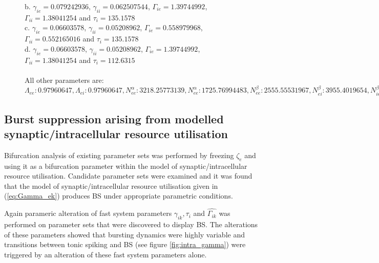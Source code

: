 \documentclass[a4paper,12pt]{article}
\begin{document}
\begin{figure}
{b. $\gamma_{ie} = 0.079242936$, $\gamma_{ii} = 0.062507544$, $\Gamma_{ie} = 1.39744992$, $\Gamma_{ii} = 1.38041254$ and $\tau_i = 135.1578$ \\
c. $\gamma_{ie} = 0.06603578$, $\gamma_{ii} = 0.05208962$, $\Gamma_{ie} = 0.558979968$, $\Gamma_{ii} = 0.552165016$ and $\tau_i = 135.1578$ \\
d. $\gamma_{ie} = 0.06603578$, $\gamma_{ii} = 0.05208962$, $\Gamma_{ie} = 1.39744992$, $\Gamma_{ii} = 1.38041254$ and $\tau_i = 112.6315$ \\
\\
All other parameters are:\\
$\Lambda_{ee}: 0.97960647, \Lambda_{ei}: 0.97960647, N^{\alpha}_{ee}: 3218.25773139, N^{\alpha}_{ee}: 1725.76994483,
N^{\beta}_{ee}: 2555.55531967, N^{\beta}_{ei}: 3955.4019654, N^{\beta}_{ie}: 558.83565101, N^{\beta}_{ii}: 805.76418084,
\Gamma_{ee}: 0.15172837, \Gamma_{ei}: 0.27123796, 
g: 0.7, \gamma_{ee}: 0.31475255879, \gamma_{ei}: 0.24594817, h^{rest}_e: -66.96584987, h^{eq}_{ee}: 0.0353266, h^{eq}_{ei}: -6.84352222,
h^{rest}_i: -77.90610838, h^{eq}_{ie}: -85.52639408, h^{eq}_{ii}: -85.434985,
\mu_e: -50.73253197, \mu_i: -51.66219544, p_{ee}: 2.1687293948, p_{ei}: 2.4342247579, p_{ie}: 0.0, p_{ii}: 0.0, \phi_{ie}: 0,
\phi_{ii}: 0, S^{max}_e: 0.101903, S^{max}_i: 0.469, \sigma_e: 6.02438944, \sigma_i: 4.21865921,
\rho_e: 2000.0, \rho_i: 2000.0, \tau_e: 139.779, \tau_i: 135.1578, \tau^{slow}: 6988.95,
  v: 0.681401$
}
\end{figure}


\subsection{Burst suppression arising from modelled synaptic/intracellular resource utilisation}
Bifurcation analysis of existing parameter sets was performed by freezing $\zeta_e$ and using it as a bifurcation parameter within the model of synaptic/intracellular resource utilisation. Candidate parameter sets were examined and it was found that the model of synaptic/intracellular resource utilisation given in (\ref{eq:Gamma_ek}) produces BS under appropriate parametric conditions. 

Again parameric alteration of fast system parameters $\gamma_{ik}, \tau_i$ and $\hat{\Gamma_{ik}}$ was performed on parameter sets that were discovered to display BS. The alterations of these parameters showed that bursting dynamics were highly variable and transitions between tonic spiking and BS (see figure \ref{fig:intra_gamma}) were triggered by an alteration of these fast system parameters alone.
\end{document}
